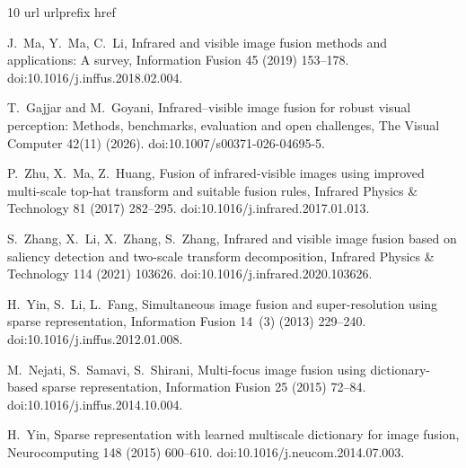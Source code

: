 \begin{thebibliography}{10}
\expandafter\ifx\csname url\endcsname\relax
  \def\url#1{\texttt{#1}}\fi
\expandafter\ifx\csname urlprefix\endcsname\relax\def\urlprefix{URL }\fi
\expandafter\ifx\csname href\endcsname\relax
  \def\href#1#2{#2} \def\path#1{#1}\fi

J.~Ma, Y.~Ma, C.~Li, {Infrared and visible image fusion methods and
  applications: A survey}, Information Fusion 45 (2019) 153--178.
\newblock \href {https://doi.org/10.1016/j.inffus.2018.02.004}
  {\path{doi:10.1016/j.inffus.2018.02.004}}.

T.~Gajjar and M.~Goyani, {Infrared--visible image fusion for robust visual
  perception: Methods, benchmarks, evaluation and open challenges}, The Visual
  Computer 42(11) (2026).
\newblock \href {https://doi.org/10.1007/s00371-026-04695-5}
  {\path{doi:10.1007/s00371-026-04695-5}}.

P.~Zhu, X.~Ma, Z.~Huang, {Fusion of infrared-visible images using improved
  multi-scale top-hat transform and suitable fusion rules}, Infrared Physics \&
  Technology 81 (2017) 282--295.
\newblock \href {https://doi.org/10.1016/j.infrared.2017.01.013}
  {\path{doi:10.1016/j.infrared.2017.01.013}}.

S.~Zhang, X.~Li, X.~Zhang, S.~Zhang, {Infrared and visible image fusion based
  on saliency detection and two-scale transform decomposition}, Infrared
  Physics \& Technology 114 (2021) 103626.
\newblock \href {https://doi.org/10.1016/j.infrared.2020.103626}
  {\path{doi:10.1016/j.infrared.2020.103626}}.

H.~Yin, S.~Li, L.~Fang, {Simultaneous image fusion and super-resolution using
  sparse representation}, Information Fusion 14~(3) (2013) 229--240.
\newblock \href {https://doi.org/10.1016/j.inffus.2012.01.008}
  {\path{doi:10.1016/j.inffus.2012.01.008}}.

M.~Nejati, S.~Samavi, S.~Shirani, {Multi-focus image fusion using
  dictionary-based sparse representation}, Information Fusion 25 (2015) 72--84.
\newblock \href {https://doi.org/10.1016/j.inffus.2014.10.004}
  {\path{doi:10.1016/j.inffus.2014.10.004}}.

H.~Yin, {Sparse representation with learned multiscale dictionary for image
  fusion}, Neurocomputing 148 (2015) 600--610.
\newblock \href {https://doi.org/10.1016/j.neucom.2014.07.003}
  {\path{doi:10.1016/j.neucom.2014.07.003}}.


\end{thebibliography}
